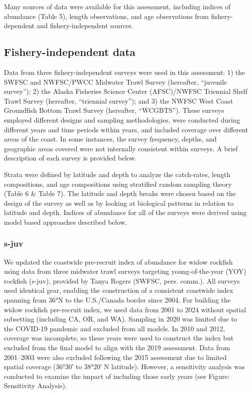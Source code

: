 \documentclass[
]{scrartcl}
\begin{document}
Many sources of data were available for this assessment, including
indices of abundance (Table 5), length observations, and age
observations from fishery-dependent and fishery-independent sources.

\subsection{Fishery-independent data}\label{fishery-independent-data}

Data from three fishery-independent surveys were used in this
assessment: 1) the SWFSC and NWFSC/PWCC Midwater Trawl Survey
(hereafter, ``juvenile survey''); 2) the Alaska Fisheries Science Center
(AFSC)/NWFSC Triennial Shelf Trawl Survey (hereafter, ``triennial
survey''); and 3) the NWFSC West Coast Groundfish Bottom Trawl Survey
(hereafter, ``WCGBTS''). These surveys employed different designs and
sampling methodologies, were conducted during different years and time
periods within years, and included coverage over different areas of the
coast. In some instances, the survey frequency, depths, and geographic
areas covered were not internally consistent within surveys. A brief
description of each survey is provided below.

Strata were defined by latitude and depth to analyze the catch-rates,
length compositions, and age compositions using stratified random
sampling theory (Table 6 \& Table 7). The latitude and depth breaks were
chosen based on the design of the survey as well as by looking at
biological patterns in relation to latitude and depth. Indices of
abundance for all of the surveys were derived using model based
approaches described below.

\subsubsection{\texorpdfstring{\acrlong{s-juv}}{}}\label{section}

We updated the coastwide pre-recruit index of abundance for widow
rockfish using data from three midwater trawl surveys targeting
young-of-the-year (YOY) rockfish (\gls{s-juv}), provided by Tanya Rogers
(SWFSC, pers. comm.). All surveys used identical gear, enabling the
construction of a consistent coastwide index spanning from 36°N to the
U.S./Canada border since 2004. For building the widow rockfish
pre-recruit index, we used data from 2001 to 2024 without spatial
subsetting (including CA, OR, and WA). Sampling in 2020 was limited due
to the COVID-19 pandemic and excluded from all models. In 2010 and 2012,
coverage was incomplete, so these years were used to construct the index
but excluded from the final model to align with the 2019 assessment.
Data from 2001--2003 were also excluded following the 2015 assessment
due to limited spatial coverage (36°30′ to 38°20′ N latitude). However,
a sensitivity analysis was conducted to examine the impact of including
those early years (see Figure: Sensitivity Analysis).
\end{document}
